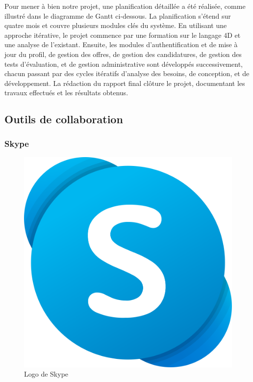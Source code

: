 Pour mener à bien notre projet, une planification détaillée a été réalisée, comme illustré dans le diagramme de Gantt ci-dessous. 
La planification s'étend sur quatre mois et couvre plusieurs modules clés du système. En utilisant une approche itérative, le projet commence 
par une formation sur le langage 4D et une analyse de l'existant. Ensuite, les modules d'authentification et de mise à jour du profil, 
de gestion des offres, de gestion des candidatures, de gestion des tests d'évaluation, et de gestion administrative sont développés successivement, 
chacun passant par des cycles itératifs d'analyse des besoins, de conception, et de développement. La rédaction du rapport final clôture le projet, 
documentant les travaux effectués et les résultats obtenus.

\subsection{Outils de collaboration}
\subsubsection{Skype}
\begin{figure}[h]
    \centering
    \includegraphics[scale=0.06]{Images/skype.png} %
    \caption{Logo de Skype\cite{skype}}
    \label{fig:gantt}
\end{figure}


